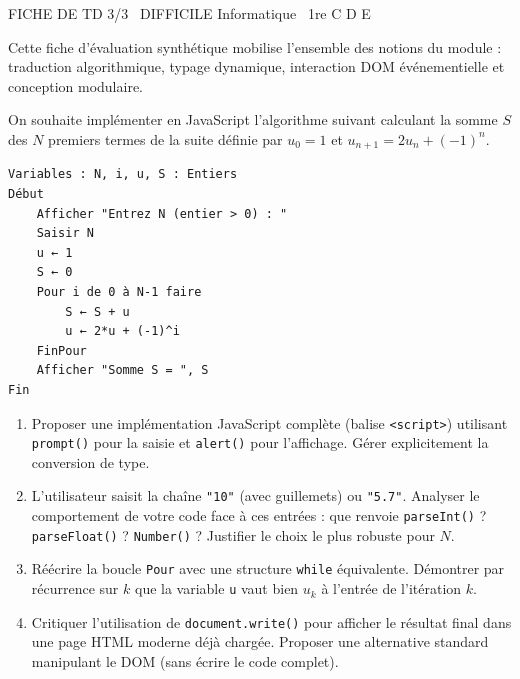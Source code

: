 \documentclass[11pt]{article}
\begin{document}
\begin{tcolorbox}[enhanced,colback=popink,colframe=popink,arc=10pt,boxrule=0pt,left=12pt,right=12pt,top=9pt,bottom=9pt]
{\color{white}\popxbold\small FICHE DE TD 3/3 \textbullet\ DIFFICILE \hfill Informatique \textbullet\ 1re C D E\par}
\end{tcolorbox}
\vspace{4pt}
Cette fiche d'évaluation synthétique mobilise l'ensemble des notions du module : traduction algorithmique, typage dynamique, interaction DOM événementielle et conception modulaire.

\begin{exercice}
On souhaite implémenter en JavaScript l'algorithme suivant calculant la somme $S$ des $N$ premiers termes de la suite définie par $u_0 = 1$ et $u_{n+1} = 2u_n + (-1)^n$.

\begin{verbatim}
Variables : N, i, u, S : Entiers
Début
    Afficher "Entrez N (entier > 0) : "
    Saisir N
    u ← 1
    S ← 0
    Pour i de 0 à N-1 faire
        S ← S + u
        u ← 2*u + (-1)^i
    FinPour
    Afficher "Somme S = ", S
Fin
\end{verbatim}

\begin{enumerate}
    \item Proposer une implémentation JavaScript complète (balise \texttt{<script>}) utilisant \texttt{prompt()} pour la saisie et \texttt{alert()} pour l'affichage. Gérer explicitement la conversion de type.
    \item L'utilisateur saisit la chaîne \texttt{"10"} (avec guillemets) ou \texttt{"5.7"}. Analyser le comportement de votre code face à ces entrées : que renvoie \texttt{parseInt()} ? \texttt{parseFloat()} ? \texttt{Number()} ? Justifier le choix le plus robuste pour $N$.
    \item Réécrire la boucle \texttt{Pour} avec une structure \texttt{while} équivalente. Démontrer par récurrence sur $k$ que la variable \texttt{u} vaut bien $u_k$ à l'entrée de l'itération $k$.
    \item Critiquer l'utilisation de \texttt{document.write()} pour afficher le résultat final dans une page HTML moderne déjà chargée. Proposer une alternative standard manipulant le DOM (sans écrire le code complet).
\end{enumerate}
\end{exercice}
\end{document}
